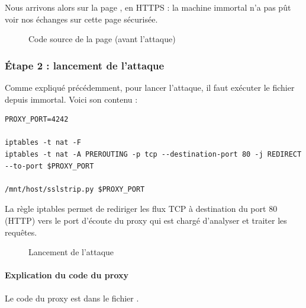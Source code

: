 Nous arrivons alors sur la page , en HTTPS : la machine immortal n'a pas pût voir nos échanges sur cette page sécurisée.

\begin{figure}[H]
  \caption{Code source de la page (avant l'attaque)}
\end{figure}

\subsubsection{Étape 2 : lancement de l'attaque}

Comme expliqué précédemment, pour lancer l'attaque, il faut exécuter le fichier  depuis immortal. Voici son contenu :

\begin{verbatim}
PROXY_PORT=4242

iptables -t nat -F
iptables -t nat -A PREROUTING -p tcp --destination-port 80 -j REDIRECT --to-port $PROXY_PORT

/mnt/host/sslstrip.py $PROXY_PORT
\end{verbatim}

La règle iptables permet de rediriger les flux TCP à destination du port 80 (HTTP) vers le port d'écoute du proxy qui est chargé d'analyser et traiter les requêtes.

\begin{figure}[H]
  \caption{Lancement de l'attaque}
\end{figure}

\paragraph{Explication du code du proxy \\}

Le code du proxy est dans le fichier .

